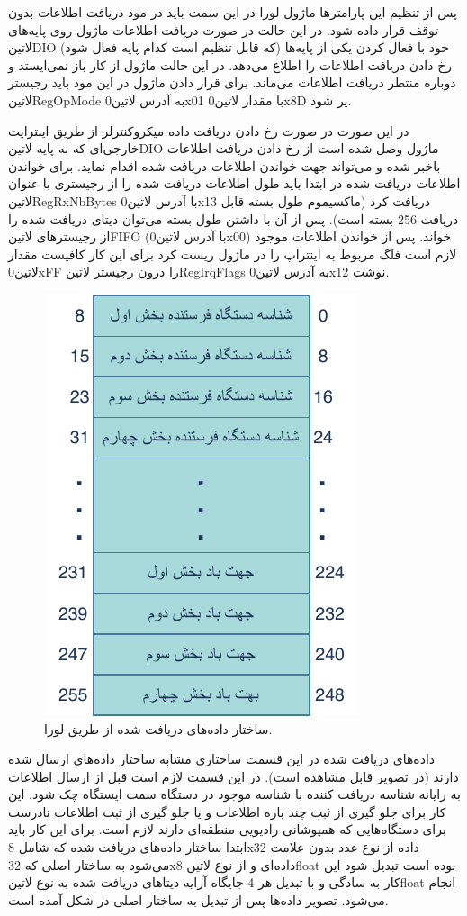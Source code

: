 پس از تنظیم این پارامتر‌ها ماژول لورا در این سمت باید در مود دریافت اطلاعات بدون توقف قرار داده شود. در این حالت در صورت دریافت اطلاعات ماژول روی پایه‌های ‌لاتین{DIO} خود با فعال کردن یکی از پایه‌ها (که قابل تنظیم است کذام پایه فعال شود) رخ دادن دریافت اطلاعات را اطلاع می‌دهد. در این حالت ماژول از کار باز نمی‌ایستد و دوباره منتظر دریافت اطلاعات می‌ماند. برای قرار دادن ماژول در این مود باید رجیستر ‌لاتین{RegOpMode} به آدرس  لاتین{0x01} با مقدار ‌لاتین{0x8D} پر شود. 

در این صورت در صورت رخ دادن دریافت داده میکرو‌کنترلر از طریق اینتراپت خارجی‌ای که به پایه ‌لاتین{DIO} ماژول وصل شده است از رخ دادن دریافت اطلاعات باخبر شده و می‌تواند جهت خواندن اطلاعات دریافت شده اقدام نماید. برای خواندن اطلاعات دریافت شده در ابتدا باید طول اطلاعات دریافت شده را از رجیستری با عنوان ‌لاتین{RegRxNbBytes} با آدرس ‌لاتین{0x13} دریافت کرد (ماکسیموم طول بسته قابل دریافت 256 بسته است). پس از آن با داشتن طول بسته می‌توان دیتای دریافت شده را از رجیستر‌های ‌لاتین{FIFO} (با آدرس ‌لاتین{0x00}) خواند. پس از خواندن اطلاعات موجود لازم است فلگ مربوط به اینتراپ را در ماژول ریست کرد برای این کار کافیست مقدار ‌لاتین{0xFF} را درون رجیستر ‌لاتین{RegIrqFlags} به آدرس ‌لاتین{0x12} نوشت. 

\begin{figure}[H]
	\centering
	\includegraphics[width=0.4\linewidth]{Assets/loraData.pdf}
	\caption{ساختار داده‌های دریافت شده از طریق لورا.}
	\label{fig:loraDataReceive}
\end{figure}

داده‌های دریافت شده در این قسمت ساختاری مشابه ساختار داده‌های ارسال شده دارند (در تصویر  قابل مشاهده است). در این قسمت لازم است قبل از ارسال اطلاعات به رایانه شناسه دریافت کننده با شناسه موجود در دستگاه سمت ایستگاه چک شود. این کار برای جلو گیری از ثبت چند باره اطلاعات و یا جلو گیری از ثبت اطلاعات نادرست برای دستگاه‌هایی که همپوشانی رادیویی منطقه‌ای دارند لازم است. برای این کار باید ابتدا ساختار داده‌های دریافت شده که شامل 8x32 داده از نوع عدد بدون علامت می‌شود به ساختار اصلی که 32x8 داده‌ای و از نوع ‌لاتین{float} بوده است تبدیل شود این کار به سادگی و با تبدیل هر 4 جایگاه آرایه دیتا‌های دریافت شده به نوع ‌لاتین{float} انجام می‌شود. تصویر داده‌ها پس از تبدیل به ساختار اصلی در شکل  آمده است.

